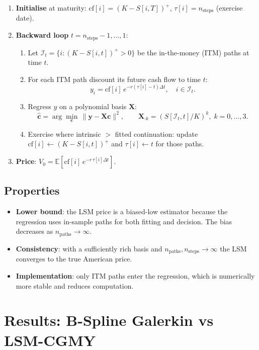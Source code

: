 \documentclass[11pt,a4paper]{article}
\newcommand{\E}{\mathbb{E}}
\begin{document}
\begin{enumerate}
  \item \textbf{Initialise} at maturity:
    $\mathrm{cf}[i] = (K - S[i,T])^+$, \;
    $\tau[i] = n_{\mathrm{steps}}$ (exercise date).
  \item \textbf{Backward loop} $t = n_{\mathrm{steps}}-1, \ldots, 1$:
    \begin{enumerate}
      \item Let $\mathcal{I}_t = \{i : (K - S[i,t])^+ > 0\}$ be the
        in-the-money (ITM) paths at time $t$.
      \item For each ITM path discount its future cash flow to time $t$:
        \[
          y_i = \mathrm{cf}[i]\,e^{-r(\tau[i]-t)\Delta t}, \quad i \in \mathcal{I}_t.
        \]
      \item Regress $y$ on a polynomial basis $\mathbf{X}$:
        \[
          \hat{\mathbf{c}} = \arg\min_{\mathbf{c}}\,\|\mathbf{y} - \mathbf{X}\mathbf{c}\|^2,
          \qquad
          \mathbf{X}_{\cdot k} = (S[\mathcal{I}_t, t] / K)^k,\;k=0,\ldots,3.
        \]
      \item Exercise where intrinsic $>$ fitted continuation:
        update $\mathrm{cf}[i] \leftarrow (K - S[i,t])^+$ and
        $\tau[i] \leftarrow t$ for those paths.
    \end{enumerate}
  \item \textbf{Price}: $V_0 = \E\!\left[\mathrm{cf}[i]\,e^{-r\,\tau[i]\Delta t}\right]$.
\end{enumerate}

\subsection{Properties}

\begin{itemize}
  \item \textbf{Lower bound}: the LSM price is a biased-low estimator because
    the regression uses in-sample paths for both fitting and decision.  The
    bias decreases as $n_{\mathrm{paths}} \to \infty$.
  \item \textbf{Consistency}: with a sufficiently rich basis and
    $n_{\mathrm{paths}}, n_{\mathrm{steps}} \to \infty$ the LSM converges to
    the true American price.
  \item \textbf{Implementation}: only ITM paths enter the regression, which
    is numerically more stable and reduces computation.
\end{itemize}

\section{Results: B-Spline Galerkin vs LSM-CGMY}
\end{document}
